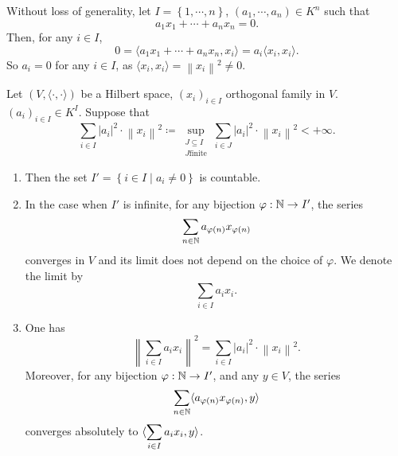 \begin{proofenv}
    Without loss of generality, let $I = \left\{1,\cdots,n\right\}$, $\left(a_1,\cdots,a_n\right)\in K^n$ such that
    $$ a_1 x_1 + \cdots + a_n x_n =0.$$
    Then, for any $i\in I$, 
    $$ 0 = \langle a_1 x_1 + \cdots + a_n x_n, x_i\rangle = a_i \langle x_i, x_i\rangle.$$
    So $a_i =0$ for any $i\in I$, as $\langle x_i,x_i\rangle = \left\| x_i \right\|^2 \neq 0$.
\end{proofenv}
\begin{propositionenv}
    Let $\left(V, \langle \cdot, \cdot\rangle\right)$ be a Hilbert space, $\left(x_i\right)_{i\in I}$ orthogonal family in $V$. $\left(a_i\right)_{i\in I} \in K^I$. Suppose that 
    $$ \sum_{i\in I} \left|a_i\right|^2 \cdot \left\|x_i\right\|^2 \coloneq \sup_{\substack{J\subseteq I\\ J \text{finite}}} \sum_{i\in J} \left|a_i\right|^2 \cdot \left\|x_i\right\|^2 < +\infty.$$
    \begin{enumerate}
        \item Then the set $I' = \left\{i\in I \mid a_i \neq 0\right\}$ is countable.
        \item In the case when $I'$ is infinite, for any bijection $ \varphi : \mathbb{N} \rightarrow I'$, the series
        $$ \sum_{n\in \mathbb{N}} a_{\varphi(n)} x_{\varphi(n)}$$
        converges in $V$ and its limit does not depend on the choice of $\varphi$.
        We denote the limit by $$\sum_{i\in I} a_i x_i.$$
        \item One has 
        $$ \left\| \sum_{i\in I} a_i x_i\right\|^2 = \sum_{i\in I} \left|a_i\right|^2 \cdot \left\|x_i\right\|^2.$$
        Moreover, for any bijection $\varphi : \mathbb{N} \rightarrow I'$, and any $y \in V$, the series
        $$ \sum_{n\in \mathbb{N}} \langle a_{\varphi(n)} x_{\varphi(n)}, y\rangle$$
        converges absolutely  to $\displaystyle \langle \sum_{i\in I} a_i x_i, y\rangle$.
    \end{enumerate}
\end{propositionenv}


